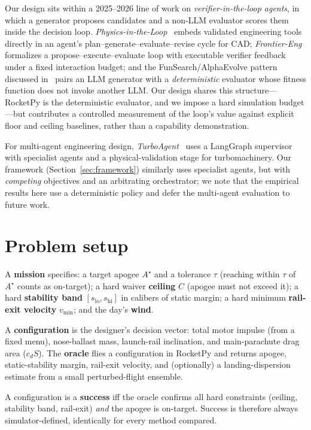 \documentclass[11pt]{article}
\begin{document}
Our design sits within a 2025--2026 line of work on \emph{verifier-in-the-loop
agents}, in which a generator proposes candidates and a non-LLM evaluator scores
them inside the decision loop. \emph{Physics-in-the-Loop}~\cite{pil} embeds
validated engineering tools directly in an agent's plan--generate--evaluate--revise
cycle for CAD; \emph{Frontier-Eng}~\cite{frontiereng} formalizes a
propose--execute--evaluate loop with executable verifier feedback under a fixed
interaction budget; and the FunSearch/AlphaEvolve pattern discussed
in~\cite{feedback} pairs an LLM generator with a \emph{deterministic} evaluator
whose fitness function does not invoke another LLM. Our design shares this
structure---RocketPy is the deterministic evaluator, and we impose a hard
simulation budget---but contributes a controlled measurement of the loop's value
against explicit floor and ceiling baselines, rather than a capability
demonstration.

For multi-agent engineering design, \emph{TurboAgent}~\cite{turboagent} uses a
LangGraph supervisor with specialist agents and a physical-validation stage for
turbomachinery. Our framework (Section~\ref{sec:framework}) similarly uses
specialist agents, but with \emph{competing} objectives and an arbitrating
orchestrator; we note that the empirical results here use a deterministic policy
and defer the multi-agent evaluation to future work.

\section{Problem setup}

A \textbf{mission} specifies: a target apogee $A^\star$ and a tolerance $\tau$
(reaching within $\tau$ of $A^\star$ counts as on-target); a hard waiver
\textbf{ceiling} $C$ (apogee must not exceed it); a hard \textbf{stability band}
$[s_{\text{lo}}, s_{\text{hi}}]$ in calibers of static margin; a hard minimum
\textbf{rail-exit velocity} $v_{\min}$; and the day's \textbf{wind}.

A \textbf{configuration} is the designer's decision vector: total motor impulse
(from a fixed menu), nose-ballast mass, launch-rail inclination, and
main-parachute drag area ($c_d S$). The \textbf{oracle} flies a configuration in
RocketPy and returns apogee, static-stability margin, rail-exit velocity, and
(optionally) a landing-dispersion estimate from a small perturbed-flight
ensemble.

A configuration is a \textbf{success} iff the oracle confirms all hard
constraints (ceiling, stability band, rail-exit) \emph{and} the apogee is
on-target. Success is therefore always simulator-defined, identically for every
method compared.
\end{document}
